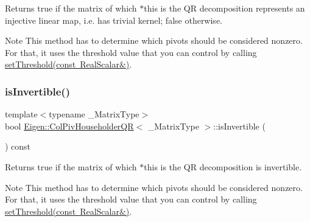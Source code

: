 \begin{DoxyReturn}{Returns}
true if the matrix of which $\ast$this is the QR decomposition represents an injective linear map, i.\+e. has trivial kernel; false otherwise.
\end{DoxyReturn}
\begin{DoxyNote}{Note}
This method has to determine which pivots should be considered nonzero. For that, it uses the threshold value that you can control by calling \mbox{\hyperlink{class_eigen_1_1_col_piv_householder_q_r_ae712cdc9f0e521cfc8061bee58ff55ee}{set\+Threshold(const Real\+Scalar\&)}}. 
\end{DoxyNote}
\mbox{\label{class_eigen_1_1_col_piv_householder_q_r_a945720f8d683f8ebe97fa807edd3142a}} 
\subsubsection{\texorpdfstring{isInvertible()}{isInvertible()}}
{\footnotesize\ttfamily template$<$typename \+\_\+\+Matrix\+Type$>$ \\
bool \mbox{\hyperlink{class_eigen_1_1_col_piv_householder_q_r}{Eigen\+::\+Col\+Piv\+Householder\+QR}}$<$ \+\_\+\+Matrix\+Type $>$\+::is\+Invertible (\begin{DoxyParamCaption}{ }\end{DoxyParamCaption}) const\hspace{0.3cm}{\ttfamily [inline]}}

\begin{DoxyReturn}{Returns}
true if the matrix of which $\ast$this is the QR decomposition is invertible.
\end{DoxyReturn}
\begin{DoxyNote}{Note}
This method has to determine which pivots should be considered nonzero. For that, it uses the threshold value that you can control by calling \mbox{\hyperlink{class_eigen_1_1_col_piv_householder_q_r_ae712cdc9f0e521cfc8061bee58ff55ee}{set\+Threshold(const Real\+Scalar\&)}}. 
\end{DoxyNote}
\mbox{\label{class_eigen_1_1_col_piv_householder_q_r_a87a7d06e0b0479e5b56b19c2a4f56365}} 
